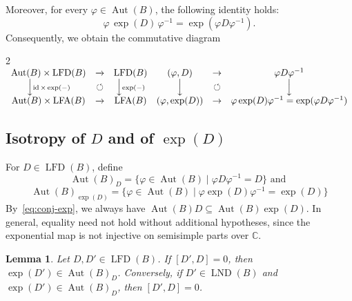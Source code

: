 \documentclass[11pt,a4paper,reqno]{amsart}
\newtheorem{lemma}[theorem]{Lemma}
\newcommand{\LND}[0]{\ensuremath{\operatorname{LND}}}
\newcommand{\Aut}[0]{\ensuremath{\operatorname{Aut}}}
\begin{document}
Moreover, for every $\varphi\in \operatorname{Aut}(B)$, the following identity holds:
\begin{equation}\label{eq:conj-exp}
\varphi\,\exp(D)\,\varphi^{-1}=\exp(\varphi D\varphi^{-1}).
\end{equation}
Consequently, we obtain the commutative diagram
\begin{multicols}{2}
$
\begin{array}[c]{ccc}
\nonumber \operatorname{Aut}(B)\times \operatorname{LFD}(B)&\xrightarrow{} &\operatorname{LFD}(B)\\
\nonumber \Big\downarrow\scriptstyle{\operatorname{id}\times\exp(-)} &\circlearrowleft&\Big\downarrow\scriptstyle{\exp(-)}\\
\nonumber \operatorname{Aut}(B)\times \operatorname{LFA}(B)&\xrightarrow{}&\operatorname{LFA}(B)
\end{array}
\begin{array}[c]{ccc}
\nonumber (\varphi, D)&\to &\varphi D\varphi^{-1}\\
\nonumber \Big\downarrow &\circlearrowleft &\Big\downarrow\\
\nonumber (\varphi,\exp(D))&\to &\varphi\exp(D)\varphi^{-1}=\exp(\varphi D\varphi^{-1})
\end{array}
$
\end{multicols}
 
\subsection{Isotropy of $D$ and of $\exp(D)$}
 
For $D\in \operatorname{LFD}(B)$, define 
\[
\Aut(B)_D=\{\varphi\in\Aut(B)\mid \varphi D\varphi^{-1}=D\} \mbox{ and } 
\]
\[
\Aut(B)_{\exp(D)}=\{\varphi\in\Aut(B)\mid \varphi\exp(D)\varphi^{-1}=\exp(D)\}
\]
By~\eqref{eq:conj-exp}, we always have $\Aut(B)D\subseteq \Aut(B){\exp(D)}$. In general, equality need not hold without additional hypotheses, since the exponential map is not injective on semisimple parts over $\mathbb{C}$.
 
\begin{lemma}\label{lem:comm-exp}
Let $D,D'\in\operatorname{LFD}(B)$. If $[D',D]=0$, then $\exp(D')\in\Aut(B)_D$.
Conversely, if $D'\in\LND(B)$ and $\exp(D')\in\Aut(B)_D$, then $[D',D]=0$.
\end{lemma}
 
\end{document}
